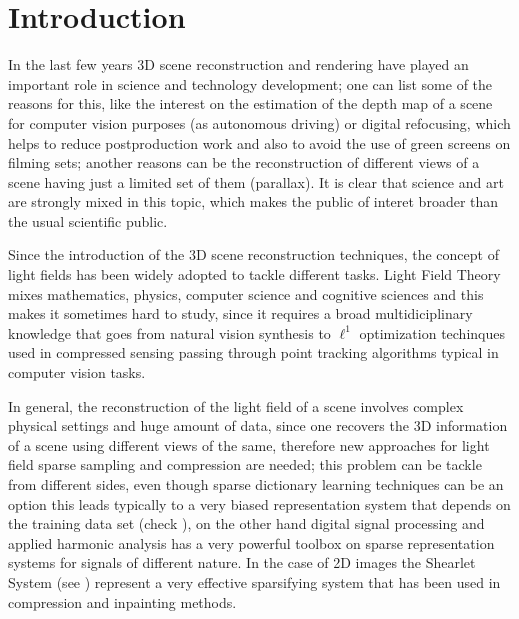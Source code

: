 \chapter{Introduction}

In the last few years 3D scene reconstruction and rendering have played an important role in science and technology development; one can list some of the reasons for this, like the interest on the estimation of the depth map of a scene for computer vision purposes (as autonomous driving) or digital refocusing, which helps to reduce postproduction work and also to avoid the use of green screens on filming sets; another reasons can be the reconstruction of different views of a scene having just a limited set of them (parallax). It is clear that science and art are strongly mixed in this topic, which makes the public of interet broader than the usual scientific public. 

\bigskip

Since the introduction of the 3D scene reconstruction techniques, the concept of light fields has been widely adopted to tackle different tasks. Light Field Theory mixes mathematics, physics, computer science and cognitive sciences and this makes it sometimes hard to study, since it requires a broad multidiciplinary knowledge that goes from natural vision synthesis to $\ell^1$ optimization techinques used in compressed sensing passing through point tracking algorithms typical in computer vision tasks.

\bigskip

In general, the reconstruction of the light field of a scene involves complex physical settings and huge amount of data, since one recovers the 3D information of a scene using different views of the same, therefore new approaches for light field sparse sampling and compression are needed; this problem can be tackle from different sides, even though sparse dictionary learning techniques can be an option this leads typically to a very biased representation system that depends on the training data set (check \cite{CompressedMIT}), on the other hand digital signal processing and applied harmonic analysis has a very powerful toolbox on sparse representation systems for signals of different nature. In the case of 2D images the Shearlet System (see \cite{IntroShearlets}) represent a very effective sparsifying system that has been used in compression and inpainting methods. 

\bigskip

